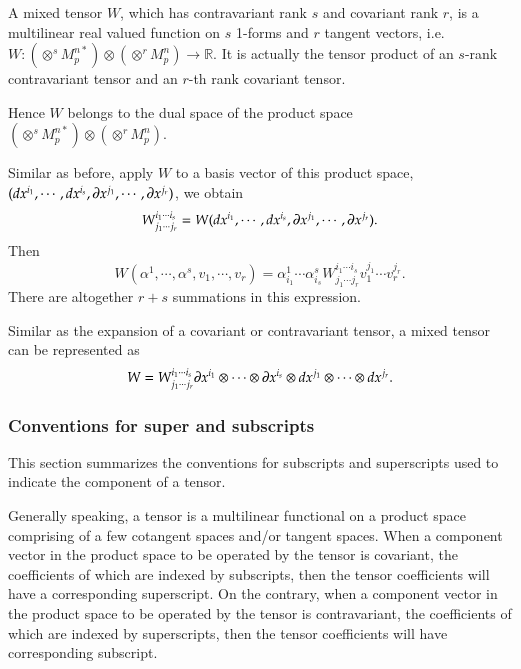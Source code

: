 \documentclass[11pt, a4paper]{book}
\begin{document}
\begin{Definition}
  A mixed tensor $W$, which has contravariant rank $s$ and covariant rank $r$, is a
  multilinear real valued function on $s$ 1-forms and $r$ tangent vectors, i.e.
  $W:\left( \otimes^s M_p^{n*} \right) \otimes \left( \otimes^r M_p^n \right) \rightarrow
  \mathbb{R}$. It is actually the tensor product of an $s$-rank contravariant tensor and
  an $r$-th rank covariant tensor.
\end{Definition}
Hence $W$ belongs to the dual space of the product space
$\left( \otimes^s M_p^{n*} \right) \otimes \left( \otimes^r M_p^n \right)$.

Similar as before, apply $W$ to a basis vector of this product space,
$(dx^{i_1},\cdots,dx^{i_s},\boldsymbol{\partial}x^{j_1},\cdots,\boldsymbol{\partial}x^{j_r})$, we obtain
\begin{equation}
  W^{i_1\cdots i_s}_{j_1\cdots j_r} = W(dx^{i_1},\cdots,dx^{i_s},\boldsymbol{\partial}x^{j_1},\cdots,\boldsymbol{\partial}x^{j_r}).
\end{equation}
Then
\begin{equation}
  W(\alpha^1,\cdots,\alpha^s,v_1,\cdots,v_r) = \alpha_{i_1}^1\cdots \alpha_{i_s}^s
  W^{i_1\cdots i_s}_{j_1\cdots j_r} v_1^{j_1}\cdots v_r^{j_r}.
\end{equation}
There are altogether $r+s$ summations in this expression.

Similar as the expansion of a covariant or contravariant tensor, a mixed tensor can be
represented as
\begin{equation}
  \label{eq:mixed-tensor-expanded-as-tensor-product}
  W = W^{i_1\cdots i_s}_{j_1\cdots j_r} \boldsymbol{\partial}x^{i_1}\otimes\cdots\otimes
  \boldsymbol{\partial}x^{i_s}\otimes dx^{j_1}\otimes\cdots\otimes dx^{j_r}.
\end{equation}

\subsubsection{Conventions for super and subscripts}

This section summarizes the conventions for subscripts and superscripts used to indicate
the component of a tensor.

Generally speaking, a tensor is a multilinear functional on a product space comprising of
a few cotangent spaces and/or tangent spaces. When a component vector in the product space
to be operated by the tensor is covariant, the coefficients of which are indexed by subscripts, then
the tensor coefficients will have a corresponding superscript. On the contrary, when a
component vector in the product space to be operated by the tensor is contravariant, the
coefficients of which are indexed by superscripts, then the tensor coefficients will have
corresponding subscript.
\end{document}
